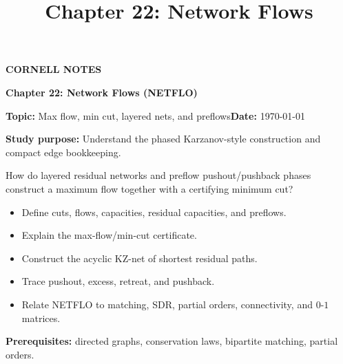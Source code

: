 \documentclass[10pt,letterpaper]{article}
\title{Chapter 22: Network Flows}
\author{}
\date{}
\begin{document}
\maketitle
\begin{tcolorbox}[colback=Paper,colframe=Ink]{\small\bfseries\color{Teal}CORNELL NOTES}\par{\LARGE\bfseries Chapter 22: Network Flows (NETFLO)}\par\medskip\textbf{Topic:} Max flow, min cut, layered nets, and preflows\hfill\textbf{Date:} \today\par\textbf{Study purpose:} Understand the phased Karzanov-style construction and compact edge bookkeeping.\end{tcolorbox}
\begin{tcolorbox}[colback=Teal!5,colframe=Teal,title=Essential question]How do layered residual networks and preflow pushout/pushback phases construct a maximum flow together with a certifying minimum cut?\end{tcolorbox}
\begin{tcolorbox}[colback=white,colframe=Mist,title=Learning objectives]\begin{itemize}\item Define cuts, flows, capacities, residual capacities, and preflows.\item Explain the max-flow/min-cut certificate.\item Construct the acyclic KZ-net of shortest residual paths.\item Trace pushout, excess, retreat, and pushback.\item Relate NETFLO to matching, SDR, partial orders, connectivity, and $0$-$1$ matrices.\end{itemize}\textbf{Prerequisites:} directed graphs, conservation laws, bipartite matching, partial orders.\end{tcolorbox}
\end{document}
